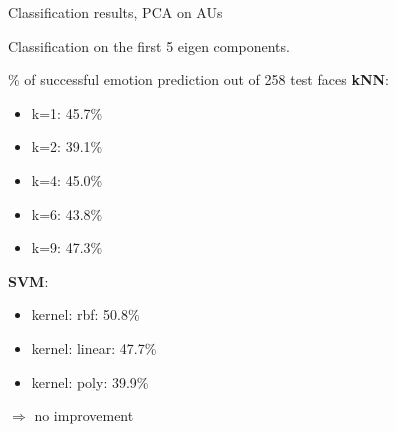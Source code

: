 \documentclass[compress]{beamer}
\begin{document}
\begin{frame}{Classification results, PCA  on AUs}

    Classification on the first 5 eigen components.

    \% of successful emotion prediction out of 258 test faces
    {\bf kNN}:
    \begin{itemize}
        \item k=1: 45.7\%
        \item k=2: 39.1\%
        \item k=4: 45.0\%
        \item k=6: 43.8\%
        \item k=9: 47.3\%
    \end{itemize}

    {\bf SVM}:

    \begin{itemize}
        \item kernel: rbf: 50.8\%
        \item kernel: linear: 47.7\%
        \item kernel: poly: 39.9\%
    \end{itemize}

    $\Rightarrow$ no improvement
\end{frame}
\end{document}
